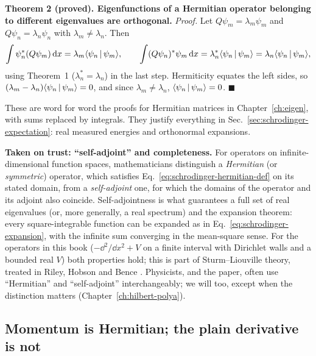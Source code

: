 \noindent\textbf{Theorem 2 (proved). Eigenfunctions of a Hermitian operator belonging to different eigenvalues are orthogonal.}
\emph{Proof.} Let $Q\psi_m=\lambda_m\psi_m$ and $Q\psi_n=\lambda_n\psi_n$ with $\lambda_m\ne\lambda_n$. Then
\[
\int\psi_n^*(Q\psi_m)\,\mathrm{d} x=\lambda_m\langle \psi_n\,|\,\psi_m\rangle,\qquad
\int(Q\psi_n)^*\psi_m\,\mathrm{d} x=\lambda_n^*\langle \psi_n\,|\,\psi_m\rangle=\lambda_n\langle \psi_n\,|\,\psi_m\rangle,
\]
using Theorem~1 ($\lambda_n^*=\lambda_n$) in the last step. Hermiticity equates the left sides, so $(\lambda_m-\lambda_n)\langle \psi_n\,|\,\psi_m\rangle=0$, and since $\lambda_m\ne\lambda_n$, $\langle \psi_n\,|\,\psi_m\rangle=0$. $\blacksquare$

These are word for word the proofs for Hermitian matrices in Chapter~\ref{ch:eigen}, with sums replaced by integrals. They justify everything in Sec.~\ref{sec:schrodinger-expectation}: real measured energies and orthonormal expansions.

\begin{beyond}
\textbf{Taken on trust: ``self-adjoint'' and completeness.} For operators on infinite-dimensional function spaces, mathematicians distinguish a \emph{Hermitian} (or \emph{symmetric}) operator, which satisfies Eq.~\eqref{eq:schrodinger-hermitian-def} on its stated domain, from a \emph{self-adjoint} one, for which the domains of the operator and its adjoint also coincide. Self-adjointness is what guarantees a full set of real eigenvalues (or, more generally, a real spectrum) and the expansion theorem: every square-integrable function can be expanded as in Eq.~\eqref{eq:schrodinger-expansion}, with the infinite sum converging in the mean-square sense. For the operators in this book ($-\dd^2/\dd x^2+V$ on a finite interval with Dirichlet walls and a bounded real $V$) both properties hold; this is part of Sturm--Liouville theory, treated in Riley, Hobson and Bence \cite{rhb}. Physicists, and the paper, often use ``Hermitian'' and ``self-adjoint'' interchangeably; we will too, except when the distinction matters (Chapter~\ref{ch:hilbert-polya}).
\end{beyond}

\subsection{Momentum is Hermitian; the plain derivative is not}

